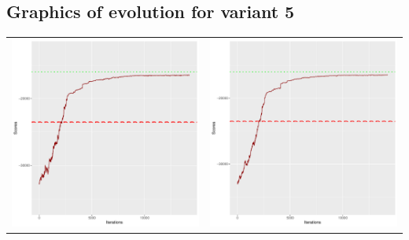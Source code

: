 \documentclass[]{scrartcl}
\begin{document}
\clearpage

\subsection{Graphics of evolution for variant 5}

\begin{table}[h!]
\begin{tabular}{cc}
\includegraphics[scale = 0.4]{./figs/win95pts/v5/25/boundsEvolution-14252.pdf} & 
\includegraphics[scale = 0.4]{./figs/win95pts/v5/50/boundsEvolution-14252.pdf} \\

\end{tabular}
\end{table}
\end{document}
